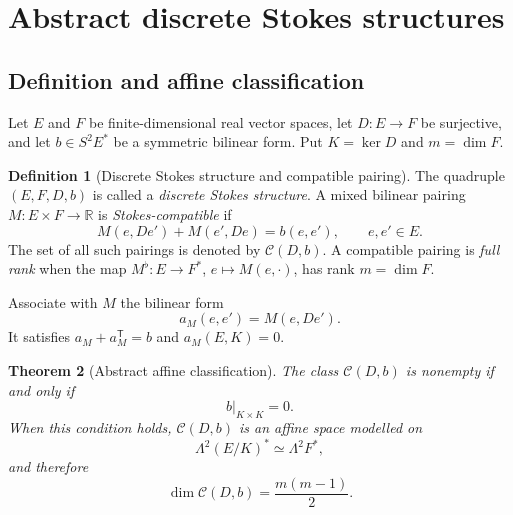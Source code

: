 \documentclass[11pt,a4paper]{article}
\newtheorem{theorem}{Theorem}[section]
\theoremstyle{definition}
\newtheorem{definition}[theorem]{Definition}
\theoremstyle{remark}
\newcommand{\R}{\mathbb{R}}
\newcommand{\Ker}{\operatorname{ker}}
\newcommand{\cC}{\mathcal{C}}
\begin{document}
\section{Abstract discrete Stokes structures}\label{sec:abstract}

\subsection{Definition and affine classification}

Let $E$ and $F$ be finite-dimensional real vector spaces, let
$D:E\to F$ be surjective, and let $b\in S^2E^*$ be a symmetric bilinear form.  Put
$K=\Ker D$ and $m=\dim F$.

\begin{definition}[Discrete Stokes structure and compatible pairing]
The quadruple $(E,F,D,b)$ is called a \emph{discrete Stokes structure}.  A mixed bilinear
pairing $M:E\times F\to\R$ is \emph{Stokes-compatible} if
\begin{equation}\label{eq:abstractstokes}
 M(e,De')+M(e',De)=b(e,e'),\qquad e,e'\in E.
\end{equation}
The set of all such pairings is denoted by $\cC(D,b)$.
A compatible pairing is \emph{full rank} when the map
$M^\flat:E\to F^*$, $e\mapsto M(e,\cdot)$, has rank $m=\dim F$.
\end{definition}

Associate with $M$ the bilinear form
\begin{equation}\label{eq:abstracta}
 a_M(e,e')=M(e,De').
\end{equation}
It satisfies $a_M+a_M^{\mathsf T}=b$ and $a_M(E,K)=0$.

\begin{theorem}[Abstract affine classification]\label{thm:abstractaffine}
The class $\cC(D,b)$ is nonempty if and only if
\begin{equation}\label{eq:abstractobstruction}
 b|_{K\times K}=0.
\end{equation}
When this condition holds, $\cC(D,b)$ is an affine space modelled on
\begin{equation}\label{eq:abstractgauge}
 \Lambda^2(E/K)^*\simeq\Lambda^2F^*,
\end{equation}
and therefore
\begin{equation}\label{eq:abstractdimension}
 \dim\cC(D,b)=\frac{m(m-1)}2.
\end{equation}
\end{theorem}
\end{document}
